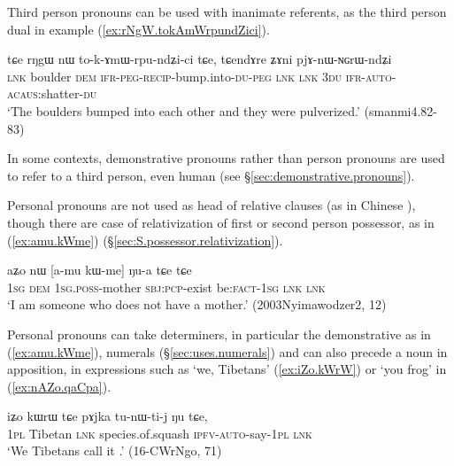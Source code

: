 Third person pronouns can be used with inanimate referents, as the third person dual  in example (\ref{ex:rNgW.tokAmWrpundZici}).

\begin{exe}
\ex \label{ex:rNgW.tokAmWrpundZici}
\gll tɕe rŋgɯ nɯ  to-k-ɤmɯ-rpu-ndʑi-ci tɕe, tɕendɤre ʑɤni pjɤ-nɯ-ɴɢrɯ-ndʑi   \\
\textsc{lnk} boulder \textsc{dem} \textsc{ifr}-\textsc{peg}-\textsc{recip}-bump.into-\textsc{du}-\textsc{peg} \textsc{lnk} \textsc{lnk} \textsc{3du} \textsc{ifr}-\textsc{auto}-\textsc{acaus}:shatter-\textsc{du} \\
\glt `The boulders bumped into each other and they were pulverized.' (smanmi4.82-83)
\end{exe}

In some contexts, demonstrative pronouns rather than person pronouns are used to refer to a third person, even human (see §\ref{sec:demonstrative.pronouns}).

Personal pronouns are not used as head of relative clauses (as in Chinese ), though there are case of relativization of first or second person possessor, as in (\ref{ex:amu.kWme}) (§\ref{sec:S.possessor.relativization}).

\begin{exe}
\ex \label{ex:amu.kWme}
\gll aʑo nɯ [a-mu kɯ-me] ŋu-a tɕe tɕe \\
\textsc{1sg} \textsc{dem} \textsc{1sg}.\textsc{poss}-mother \textsc{sbj}:\textsc{pcp}-exist be:\textsc{fact}-\textsc{1sg} \textsc{lnk} \textsc{lnk} \\
\glt `I am someone who does not have a mother.' (2003Nyimawodzer2, 12)
\end{exe}

Personal pronouns can take determiners, in particular the demonstrative  as in (\ref{ex:amu.kWme}), numerals (§\ref{sec:uses.numerals}) and can also precede a noun in apposition, in expressions such as  `we, Tibetans' (\ref{ex:iZo.kWrW}) or  `you frog' in (\ref{ex:nAZo.qaCpa}).

\begin{exe}
\ex \label{ex:iZo.kWrW}
\gll iʑo kɯrɯ tɕe pɤjka tu-nɯ-ti-j ŋu tɕe, \\
\textsc{1pl} Tibetan \textsc{lnk} species.of.squash \textsc{ipfv}-\textsc{auto}-say-\textsc{1pl} \textsc{lnk} \\
\glt `We Tibetans call it .' (16-CWrNgo, 71)
\end{exe}

